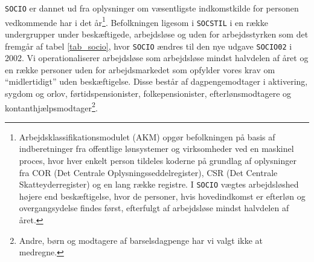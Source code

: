 \newpage \texttt{SOCIO} er dannet ud fra oplysninger om væsentligste indkomstkilde for personen vedkommende har i det år\footnote{Arbejdsklassifikationsmodulet (AKM) opgør befolkningen på basis af indberetninger fra offentlige lønsystemer og virksomheder ved en maskinel proces, hvor hver enkelt person tildeles koderne på grundlag af oplysninger fra COR (Det Centrale Oplysningsseddelregister), CSR (Det Centrale Skatteyderregister) og en lang række registre. I \texttt{SOCIO} vægtes arbejdsløshed højere end beskæftigelse, hvor de personer, hvis hovedindkomst er efterløn og overgangsydelse findes først, efterfulgt af arbejdsløse mindst halvdelen af året.}. Befolkningen ligesom i \texttt{SOCSTIL} i en række undergrupper under beskæftigede, arbejdsløse og uden for arbejdsstyrken som det fremgår af tabel \ref{tab_socio}, hvor \texttt{SOCIO} ændres til den nye udgave \texttt{SOCIO02} i 2002. Vi operationaliserer arbejdsløse som arbejdsløse mindst halvdelen af året og en række personer uden for arbejdsmarkedet som opfylder vores krav om “midlertidigt” uden beskæftigelse. Disse består af dagpengemodtager i aktivering, sygdom og orlov, førtidspensionister, folkepensionister, efterlønsmodtagere og kontanthjælpsmodtager\footnote{Andre, børn og modtagere af barselsdagpenge har vi valgt ikke at medregne.}.
%
